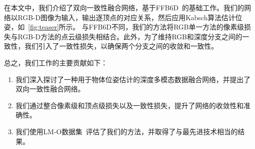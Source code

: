 在本文中，我们介绍了双向一致性融合网络，基于FFB6D~\cite{he2021ffb6d}的基础工作。我们的网络以RGB-D图像为输入，输出逐顶点的对应关系，然后应用Kabsch算法估计位姿，如~\cref{fig:teaser}所示。
与FFB6D不同，我们的方法将RGB单一方法的像素级损失与RGB-D方法的点云级损失相结合。此外，为了维持RGB和深度分支之间的一致性，我们引入了一致性损失，以确保两个分支之间的收敛和一致性。

总之，我们工作的主要贡献如下：
\begin{enumerate}
\item 我们深入探讨了一种用于物体位姿估计的深度多模态数据融合网络，并提出了双向一致性融合网络。
\item 我们通过整合像素级和顶点级损失以及一致性损失，提升了网络的收敛性和准确性。
\item 我们使用LM-O数据集~\cite{lmo}评估了我们的方法，并取得了与最先进技术相当的结果。
\end{enumerate}